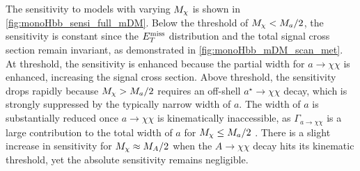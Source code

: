 The sensitivity to models with varying $M_{\chi}$ is shown in  \autoref{fig:monoHbb_sensi_full_mDM}.
Below the threshold of $M_{\chi} < M_{a}/2$, the sensitivity is constant since the $E_T^\mathrm{miss}$ distribution and the total signal cross section remain invariant, as demonstrated in \autoref{fig:monoHbb_mDM_scan_met}.
At threshold, the sensitivity is enhanced because the partial width for $ a \to \chi \chi $ is enhanced, 
increasing the signal cross section.
Above threshold, the sensitivity drops rapidly because $M_{\chi} > M_{a}/2$ requires an off-shell $a^{\star} \to \chi\chi$ decay, which is strongly suppressed by the typically  narrow width of $a$. 
The width of $a$ is substantially reduced once $a\to \chi \chi$ is kinematically inaccessible, 
as $\Gamma_{a\to \chi \chi}$ is a large contribution to the total width of $a$ for $M_{\chi} \leq M_{a}/2$ \cite{Bauer:2017ota}.
There is a slight increase in sensitivity for $M_{\chi} \approx M_{A}/2$ when the $A\to \chi\chi$ decay hits its kinematic threshold, yet the absolute sensitivity remains negligible.
